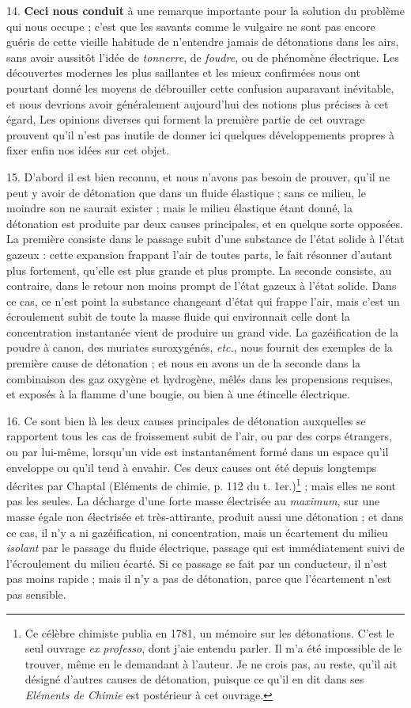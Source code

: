 \documentclass[a4paper, 11pt, oneside, polutonikogreek, french]{article}
\begin{document}
14. \textbf{Ceci nous conduit} à une remarque importante pour la solution du problème qui nous occupe ; c'est que les savants comme le vulgaire ne sont pas encore guéris de cette vieille habitude de n'entendre jamais de détonations dans les airs, sans avoir aussitôt l'idée de \emph{tonnerre}, de \emph{foudre}, ou de phénomène électrique. Les découvertes modernes les plus saillantes et les mieux confirmées nous ont pourtant donné les moyens de débrouiller cette confusion auparavant inévitable, et nous devrions avoir généralement aujourd’hui des notions plus précises à cet égard, Les opinions diverses qui forment la première partie de cet ouvrage prouvent qu'il n'est pas inutile de donner ici quelques développements propres à fixer enfin nos idées sur cet objet.

15. D'abord il est bien reconnu, et nous n'avons pas besoin de prouver, qu'il ne peut y avoir de détonation que dans un fluide élastique ; sans ce milieu, le moindre son ne saurait exister ; mais le milieu élastique étant donné, la détonation est produite par deux causes principales, et en quelque sorte opposées. La première consiste dans le passage subit d'une substance de l'état solide à l'état gazeux : cette expansion frappant l'air de toutes parts, le fait résonner d'autant plus fortement, qu'elle est plus grande et plus prompte. La seconde consiste, au contraire, dans le retour non moins prompt de l'état gazeux à l'état solide. Dans ce cas, ce n'est point la substance changeant d'état qui frappe l'air, mais c'est un écroulement subit de toute la masse fluide qui environnait celle dont la concentration instantanée vient de produire un grand vide. La gazéification de la poudre à canon, des muriates suroxygénés, \emph{etc.}, nous fournit des exemples de la première cause de détonation ; et nous en avons un de la seconde dans la combinaison des gaz oxygène et hydrogène, mêlés dans les propensions requises, et exposés à la flamme d'une bougie, ou bien à une étincelle électrique.

16. Ce sont bien là les deux causes principales de détonation auxquelles se rapportent tous les cas de froissement subit de l'air, ou par des corps étrangers, ou par lui-même, lorsqu'un vide est instantanément formé dans un espace qu'il enveloppe ou qu'il tend à envahir. Ces deux causes ont été depuis longtemps décrites par Chaptal (Eléments de chimie, p. 112 du t. 1er.)\footnote{Ce célèbre chimiste publia en 1781, un mémoire sur les détonations. C'est le seul ouvrage \emph{ex professo}, dont j'aie entendu parler. Il m'a été impossible de le trouver, même en le demandant à l'auteur. Je ne crois pas, au reste, qu'il ait désigné d'autres causes de détonation, puisque ce qu'il en dit dans ses \emph{Eléments de Chimie} est postérieur à cet ouvrage.} ; mais elles ne sont pas les seules. La décharge d'une forte masse électrisée au \emph{maximum}, sur une masse égale non électrisée et très-attirante, produit aussi une détonation ; et dans ce cas, il n'y a ni gazéification, ni concentration, mais un écartement du milieu \emph{isolant} par le passage du fluide électrique, passage qui est immédiatement suivi de l'écroulement du milieu écarté. Si ce passage se fait par un conducteur, il n'est pas moins rapide ; mais il n'y a pas de détonation, parce que l'écartement n'est pas sensible.
\end{document}
